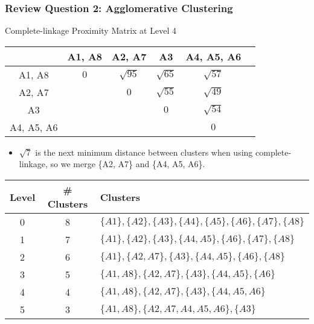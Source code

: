 \documentclass[aspectratio=169, 10pt]{beamer}
\begin{document}
\begin{frame}[t]
    \frametitle{Review Question 2: Agglomerative Clustering}
    \small

    Complete-linkage Proximity Matrix at Level 4

    \begin{table}[]
        \scriptsize
        \begin{tabular}{c|ccccc}
        \cellcolor[HTML]{FFFFFF}{\color[HTML]{000000} } & {\color[HTML]{000000} A1, A8} & {\color[HTML]{000000} A2, A7}      & {\color[HTML]{000000} A3}          & {\color[HTML]{000000} A4, A5, A6} \\ \hline
        {\color[HTML]{000000} A1, A8}                   & {\color[HTML]{000000} $0$}    & {\color[HTML]{000000} $\sqrt{95}$} & {\color[HTML]{000000} $\sqrt{65}$} & {\color[HTML]{000000} $\sqrt{57}$} \\
        {\color[HTML]{000000} A2, A7}                   & {\color[HTML]{000000} }       & {\color[HTML]{000000} $0$}         & {\color[HTML]{000000} $\sqrt{55}$} & {\color[HTML]{fe0000} $\sqrt{49}$} \\
        {\color[HTML]{000000} A3}                       & {\color[HTML]{000000} }       & {\color[HTML]{000000} }            & {\color[HTML]{000000} $0$}         & {\color[HTML]{000000} $\sqrt{54}$} \\
        {\color[HTML]{000000} A4, A5, A6}                   & {\color[HTML]{000000} }       & {\color[HTML]{000000} }            & {\color[HTML]{000000} }            & {\color[HTML]{000000} $0$}     \\
        \end{tabular}
    \end{table}

    \begin{itemize}
        \item $\sqrt{7}$ is the next minimum distance between clusters when using complete-linkage, so we merge \{A2, A7\} and \{A4, A5, A6\}.
    \end{itemize}

    \begin{table}[]
        \scriptsize
        \begin{tabular}{c|c|l}
        Level & \# Clusters & Clusters \\ \hline
        0     & 8           & $\{A1\}, \{A2\}, \{A3\}, \{A4\}, \{A5\}, \{A6\}, \{A7\}, \{A8\}$\\
        1     & 7           & $\{A1\}, \{A2\}, \{A3\}, \{A4, A5\}, \{A6\}, \{A7\}, \{A8\}$\\
        2     & 6           & $\{A1\}, \{A2, A7\}, \{A3\}, \{A4, A5\}, \{A6\}, \{A8\}$\\
        3     & 5           & $\{A1, A8\}, \{A2, A7\}, \{A3\}, \{A4, A5\}, \{A6\}$\\
        4     & 4           & $\{A1, A8\}, \{A2, A7\}, \{A3\}, \{A4, A5, A6\}$\\
        5     & 3           & $\{A1, A8\}, \{A2, A7, A4, A5, A6\}, \{A3\}$\\
        \end{tabular}
    \end{table}



\end{frame}
\end{document}
